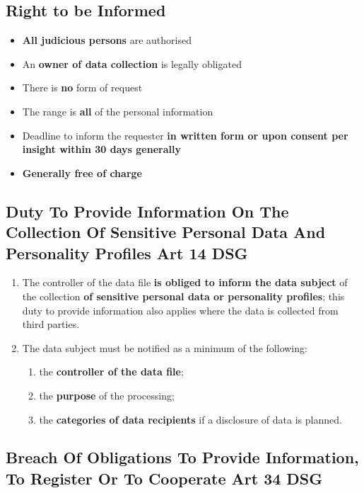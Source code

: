 \documentclass[11pt]{article}
\theoremstyle{definition}
\begin{document}
\subsection{Right to be Informed}
\begin{itemize}
	\item \textbf{All judicious persons} are authorised
	\item An \textbf{owner of data collection} is legally obligated
	\item There is \textbf{no} form of request
	\item The range is \textbf{all} of the personal information
	\item Deadline to inform the requester \textbf{in written form or upon consent per insight within 30 days generally}
	\item \textbf{Generally free of charge}
\end{itemize}

\subsection{Duty To Provide Information On The Collection Of Sensitive Personal Data And Personality Profiles Art 14 DSG}
\begin{enumerate}[label=\arabic*]
	\item The controller of the data file \textbf{is obliged to inform the data subject} of the collection \textbf{of sensitive personal data or personality profiles}; this duty to provide information also applies where the data is collected from third parties.
	\item The data subject must be notified as a minimum of the following:
	\begin{enumerate}[label=\alph*.]
		\item the \textbf{controller of the data file};
		\item the \textbf{purpose} of the processing;
		\item the \textbf{categories of data recipients} if a disclosure of data is planned.
	\end{enumerate}
\end{enumerate}

\subsection{Breach Of Obligations To Provide Information, To Register Or To Cooperate Art 34 DSG}
\end{document}
